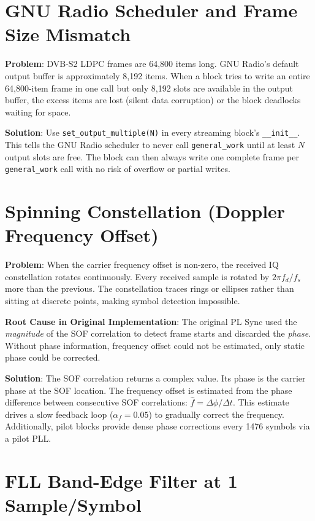 \documentclass[12pt,a4paper]{report}
\begin{document}
\section{GNU Radio Scheduler and Frame Size Mismatch}

\textbf{Problem}: DVB-S2 LDPC frames are 64,800 items long. GNU Radio's default
output buffer is approximately 8,192 items. When a block tries to write an
entire 64,800-item frame in one call but only 8,192 slots are available in the
output buffer, the excess items are lost (silent data corruption) or the block
deadlocks waiting for space.

\textbf{Solution}: Use \texttt{set\_output\_multiple(N)} in every streaming
block's \texttt{\_\_init\_\_}. This tells the GNU Radio scheduler to never call
\texttt{general\_work} until at least $N$ output slots are free. The block can
then always write one complete frame per \texttt{general\_work} call with no
risk of overflow or partial writes.

\section{Spinning Constellation (Doppler Frequency Offset)}

\textbf{Problem}: When the carrier frequency offset is non-zero, the received
IQ constellation rotates continuously. Every received sample is rotated by
$2\pi f_d / f_s$ more than the previous. The constellation traces rings or
ellipses rather than sitting at discrete points, making symbol detection
impossible.

\textbf{Root Cause in Original Implementation}: The original PL Sync used the
\emph{magnitude} of the SOF correlation to detect frame starts and discarded
the \emph{phase}. Without phase information, frequency offset could not be
estimated, only static phase could be corrected.

\textbf{Solution}: The SOF correlation returns a complex value. Its phase is
the carrier phase at the SOF location. The frequency offset is estimated from
the phase difference between consecutive SOF correlations:
$\hat{f} = \Delta\phi / \Delta t$. This estimate drives a slow feedback loop
($\alpha_f = 0.05$) to gradually correct the frequency. Additionally, pilot
blocks provide dense phase corrections every 1476 symbols via a pilot PLL.

\section{FLL Band-Edge Filter at 1 Sample/Symbol}
\end{document}
